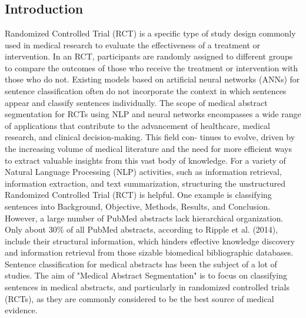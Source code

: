 \documentclass[12pt,a4paper]{report}     %
\begin{document}
\chapter{}
\begin{normalsize}
			\noindent

\section{Introduction} 	
{\setlength{\baselineskip}{1.1\baselineskip}
Randomized Controlled Trial (RCT) is a specific type of study design commonly used in medical research to evaluate the effectiveness of a treatment or intervention. In an RCT, participants are randomly assigned to different groups to compare the outcomes of those who receive the treatment or intervention with those who do not. Existing models based on artificial neural networks (ANNs) for sentence classification often do not incorporate the context in which sentences appear and classify sentences individually.
The scope of medical abstract segmentation for RCTs using NLP and neural networks encompasses a wide range of applications that contribute to the advancement of healthcare, medical research, and clinical decision-making. This field con- tinues to evolve, driven by the increasing volume of medical literature and the need for more efficient ways to extract valuable insights from this vast body of knowledge.
For a variety of Natural Language Processing (NLP) activities, such as information retrieval, information extraction, and text summarization, structuring the unstructured Randomized Controlled Trial (RCT) is helpful. One example is classifying sentences into Background, Objective, Methods, Results, and Conclusion. However, a large number of PubMed abstracts lack hierarchical organization. Only about 30\% of all PubMed abstracts, according to Ripple et al. (2014), include their structural information, which hinders effective knowledge discovery and information retrieval from those sizable biomedical bibliographic databases. Sentence classification for medical abstracts has been the subject of a lot of studies.
The aim of "Medical Abstract Segmentation" is to focus on classifying sentences in medical abstracts, and particularly in randomized controlled trials (RCTs), as they are commonly considered to be the best source of medical evidence.
\par
}	

\end{normalsize}
\end{document}
